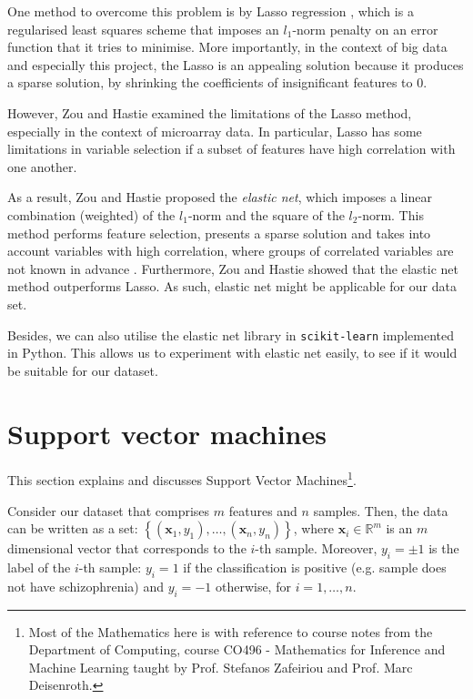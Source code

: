 \documentclass[12pt, twoside, a4paper]{report}
\begin{document}
One method to overcome this problem is by Lasso regression \cite{RefWorks:94}, which is a regularised least squares scheme that imposes an $l_1$-norm penalty on an error function that it tries to minimise. More importantly, in the context of big data and especially this project, the Lasso is an appealing solution because it produces a sparse solution, by shrinking the coefficients of insignificant features to 0.

However, Zou and Hastie \cite{RefWorks:96} examined the limitations of the Lasso method, especially in the context of microarray data. In particular, Lasso has some limitations in variable selection if a subset of features have high correlation with one another.

As a result, Zou and Hastie proposed the \textit{elastic net}, which imposes a linear combination (weighted) of the $l_1$-norm and the square of the $l_2$-norm. This method performs feature selection, presents a sparse solution and takes into account variables with high correlation, where groups of correlated variables are not known in advance \cite{RefWorks:93}. Furthermore, Zou and Hastie showed that the elastic net method outperforms Lasso. As such, elastic net might be applicable for our data set.

Besides, we can also utilise the elastic net library in \texttt{scikit-learn} implemented in Python. This allows us to experiment with elastic net easily, to see if it would be suitable for our dataset.


\section{Support vector machines}
\label{bg:svm}

This section explains and discusses Support Vector Machines\footnote{Most of the Mathematics here is with reference to course notes from the Department of Computing, course CO496 - Mathematics for Inference and Machine Learning taught by Prof. Stefanos Zafeiriou and Prof. Marc Deisenroth.}.

Consider our dataset that comprises $m$ features and $n$ samples. Then, the data can be written as a set: $\left\lbrace (\boldsymbol{x}_1, y_1), \dots, (\boldsymbol{x}_n, y_n) \right\rbrace$, where $\boldsymbol{x}_i \in \mathbb{R}^m$ is an $m$ dimensional vector that corresponds to the $i$-th sample. Moreover, $y_i = \pm 1$ is the label of the $i$-th sample: $y_i = 1$ if the classification is positive (e.g. sample does not have schizophrenia) and $y_i = -1$ otherwise, for $i = 1, \dots , n$.
\end{document}
